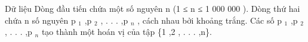 Dữ liệu
Dòng đầu tiến chứa một số nguyên n (1 ≤ n ≤ 1 000 000 ). Dòng thứ hai chứa n số nguyên p   $_    1   $   ,p   $_    2   $   , . . . ,p   $_    n   $   , cách nhau bởi khoảng trắng. Các số p   $_    1   $   ,p   $_    2   $   , . . . ,p   $_    n   $   tạo thành một hoán vị của tập \{1 ,2 , . . . ,n\}.